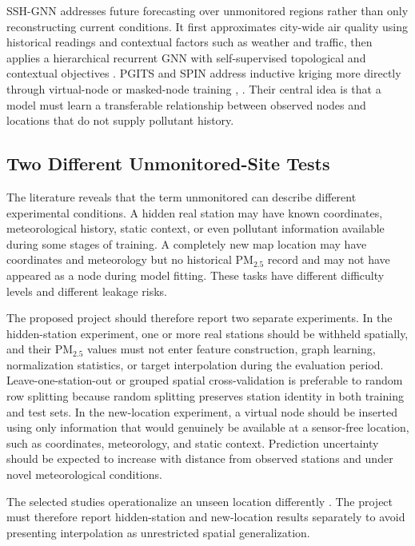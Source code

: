 SSH-GNN addresses future forecasting over unmonitored regions rather than only reconstructing current conditions. It first approximates city-wide air quality using historical readings and contextual factors such as weather and traffic, then applies a hierarchical recurrent GNN with self-supervised topological and contextual objectives \cite{ref30}. PGITS and SPIN address inductive kriging more directly through virtual-node or masked-node training \cite{ref31}, \cite{ref32}. Their central idea is that a model must learn a transferable relationship between observed nodes and locations that do not supply pollutant history.

\subsection{Two Different Unmonitored-Site Tests}

The literature reveals that the term unmonitored can describe different experimental conditions. A hidden real station may have known coordinates, meteorological history, static context, or even pollutant information available during some stages of training. A completely new map location may have coordinates and meteorology but no historical PM$_{2.5}$ record and may not have appeared as a node during model fitting. These tasks have different difficulty levels and different leakage risks.

The proposed project should therefore report two separate experiments. In the hidden-station experiment, one or more real stations should be withheld spatially, and their PM$_{2.5}$ values must not enter feature construction, graph learning, normalization statistics, or target interpolation during the evaluation period. Leave-one-station-out or grouped spatial cross-validation is preferable to random row splitting because random splitting preserves station identity in both training and test sets. In the new-location experiment, a virtual node should be inserted using only information that would genuinely be available at a sensor-free location, such as coordinates, meteorology, and static context. Prediction uncertainty should be expected to increase with distance from observed stations and under novel meteorological conditions.

The selected studies operationalize an unseen location differently \cite{ref26,ref27,ref28,ref29,ref30,ref31,ref32}. The project must therefore report hidden-station and new-location results separately to avoid presenting interpolation as unrestricted spatial generalization.

